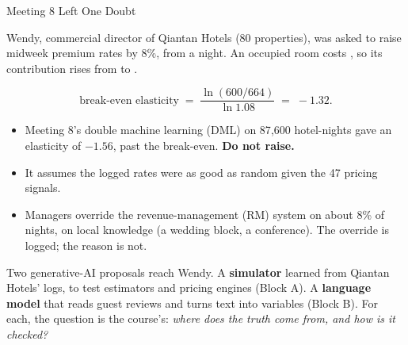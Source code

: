 \documentclass[aspectratio=169, 11pt, handout]{beamer}
\begin{document}
\begin{frame}{Meeting 8 Left One Doubt}

Wendy, commercial director of Qiantan Hotels (80 properties), was asked to raise midweek premium rates by 8\%, from  a night. An occupied room costs , so its contribution rises from  to .

\[
\text{break-even elasticity} \;=\; \frac{\ln(600/664)}{\ln 1.08} \;=\; -1.32 .
\]

\begin{itemize}
  \item Meeting 8's double machine learning (DML) on 87{,}600 hotel-nights gave an elasticity of $-1.56$, past the break-even. \textbf{Do not raise.}
  \item It assumes the logged rates were as good as random given the 47 pricing signals.
  \item Managers override the revenue-management (RM) system on about 8\% of nights, on local knowledge (a wedding block, a conference). The override is logged; the reason is not.
\end{itemize}

\medskip

Two generative-AI proposals reach Wendy. A \textbf{simulator} learned from Qiantan Hotels' logs, to test estimators and pricing engines (Block A). A \textbf{language model} that reads guest reviews and turns text into variables (Block B). For each, the question is the course's: \emph{where does the truth come from, and how is it checked?}
\end{frame}
\end{document}
